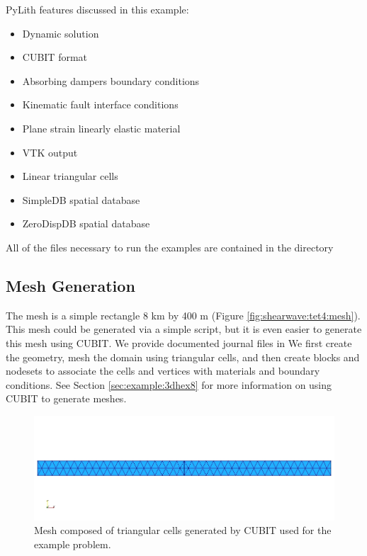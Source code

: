PyLith features discussed in this example:
\begin{itemize}
\item Dynamic solution
\item CUBIT format
\item Absorbing dampers boundary conditions
\item Kinematic fault interface conditions
\item Plane strain linearly elastic material
\item VTK output
\item Linear triangular cells
\item SimpleDB spatial database
\item ZeroDispDB spatial database
\end{itemize}
All of the files necessary to run the examples are contained in the
directory 


\subsection{Mesh Generation}

The mesh is a simple rectangle 8 km by 400 m (Figure
\vref{fig:shearwave:tet4:mesh}).  This mesh could be generated via a
simple script, but it is even easier to generate this mesh using
CUBIT. We provide documented journal files in
 We first create the geometry,
mesh the domain using triangular cells, and then create blocks and
nodesets to associate the cells and vertices with materials and
boundary conditions. See Section \vref{sec:example:3dhex8} for more
information on using CUBIT to generate meshes.

\begin{figure}
  \includegraphics[scale=0.5]{examples/figs/shearwave_tri3mesh}
  \caption{Mesh composed of triangular cells generated by CUBIT used for the
    example problem.}
\label{fig:shearwave:tri3:mesh}
\end{figure}


